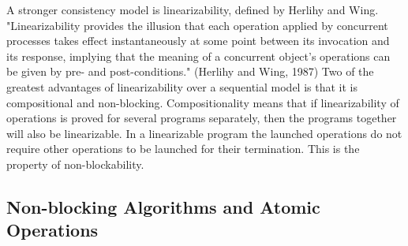 \documentclass[oneside, a4paper, onecolumn, 10pt]{article}
\begin{document}
A stronger consistency model is linearizability, defined by Herlihy and Wing. \cite{HerlihyWing} "Linearizability provides the illusion that each operation applied by concurrent processes takes effect instantaneously at some point between its invocation and its response, implying that the meaning of a concurrent object’s operations can be given by pre- and post-conditions." (Herlihy and Wing, 1987) Two of the greatest advantages of linearizability over a sequential model is that it is compositional and non-blocking. Compositionality means that if linearizability of operations is proved for several programs separately, then the programs together will also be linearizable. In a linearizable program the launched operations do not require other operations to be launched for their termination. This is the property of non-blockability.
\subsection{Non-blocking Algorithms and Atomic Operations}
\end{document}
